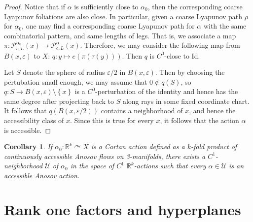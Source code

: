 \documentclass[12pt]{amsart}
\newtheorem{corollary}[theorem]{Corollary}
\theoremstyle{definition}
\theoremstyle{remark}
\numberwithin{equation}{section}
\newcommand{\id}{\mathrm{Id}}
\newcommand{\R}{\mathbb{R}}
\newcommand{\mc}{\mathcal}
\newcommand{\set}[1]{\left\lbrace #1 \right\rbrace}
\newcommand{\ve}{\varepsilon}
\newtheorem{Structural Stability Theorem}[theorem]{Structural Stability Theorem}
\begin{document}
\begin{proof}
Notice that if $\alpha$ is sufficiently close to $\alpha_0$, then the corresponding coarse Lyapunov foliations are also close. In particular, given a coarse Lyapunov path $\rho$ for $\alpha_0$, one may find a corresponding coarse Lyapunov path for $\alpha$ with the same combinatorial pattern, and same lengths of legs. That is, we associate a map $\pi : \mc P_{c,L}^{\alpha_0}(x) \to \mc P_{c,L}^\alpha(x)$. Therefore, we may consider the following map from $B(x,\ve)$ to $X$: $q : y \mapsto e(\pi(\tau(y)))$. Then $q$ is $C^0$-close to $\id$.

Let $S$ denote the sphere of radius $\ve/2$ in $B(x,\ve)$. Then by choosing the pertubation small enough, we may assume that $0 \not\in q(S)$, so $q : S \to B(x,\ve) \setminus \set{x}$ is a $C^0$-perturbation of the identity and hence has the same degree after projecting back to $S$ along rays in some fixed coordinate chart. It follows that $q(B(x,\ve/2))$ contains a neighborhood of $x$, and hence the accessibility class of $x$. Since this is true for every $x$, it follows that the action $\alpha$ is accessible. 
\end{proof}



\begin{corollary}
\label{cor:accessible}
If $\alpha_0 : \R^k \curvearrowright X$ is a Cartan action defined as a $k$-fold product of continuously accessible Anosov flows on 3-manifolds, there exists a $C^1$-neighborhood $\mc U$ of $\alpha_0$ in the space of $C^1$ $\R^k$-actions such that every $\alpha \in \mc U$ is an accessible Anosov action.
\end{corollary}


\section{Rank one factors and hyperplanes}
\label{sec:rankone-hyperplanes}
\end{document}

